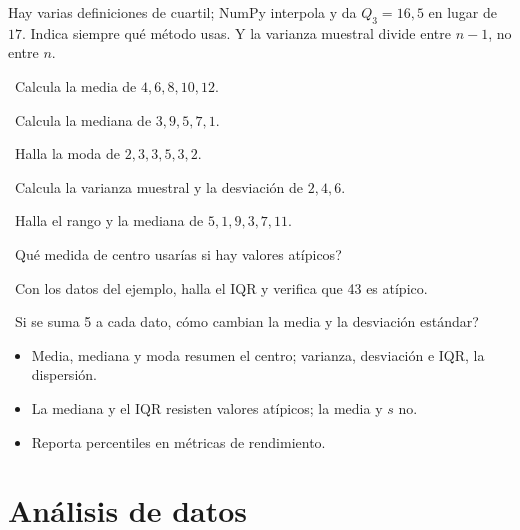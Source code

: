 \begin{tmcuidado}Hay varias definiciones de cuartil; NumPy interpola y da $Q_3=16{,}5$ en lugar de $17$. Indica siempre qu\'e m\'etodo usas. Y la varianza muestral divide entre $n-1$, no entre $n$.\end{tmcuidado}

\begin{tmejercicios}
\label{ej:5-4}
\begin{tmlista}
\item \tmbasico\ Calcula la media de $4, 6, 8, 10, 12$.
\item \tmbasico\ Calcula la mediana de $3, 9, 5, 7, 1$.
\item \tmbasico\ Halla la moda de $2, 3, 3, 5, 3, 2$.
\item \tmmedio\ Calcula la varianza muestral y la desviaci\'on de $2, 4, 6$.
\item \tmmedio\ Halla el rango y la mediana de $5, 1, 9, 3, 7, 11$.
\item \tmmedio\ \textquestiondown Qu\'e medida de centro usar\'ias si hay valores at\'ipicos?
\item \tmdificil\ Con los datos del ejemplo, halla el IQR y verifica que 43 es at\'ipico.
\item \tmdificil\ Si se suma 5 a cada dato, \textquestiondown c\'omo cambian la media y la desviaci\'on est\'andar?
\end{tmlista}
\end{tmejercicios}


\begin{tmresumen}
\begin{itemize}
\item Media, mediana y moda resumen el centro; varianza, desviaci\'on e IQR, la dispersi\'on.
\item La mediana y el IQR resisten valores at\'ipicos; la media y $s$ no.
\item Reporta percentiles en m\'etricas de rendimiento.
\end{itemize}
\end{tmresumen}

\section{An\'alisis de datos}
\label{sec:5-5}

